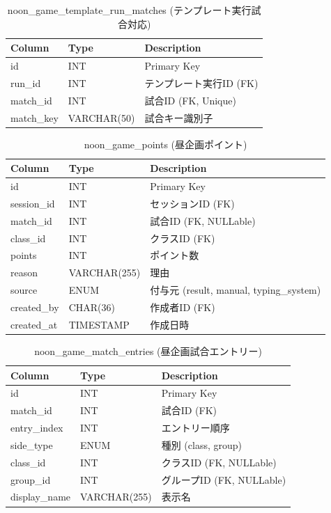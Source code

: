 \documentclass[paper=a4, fontsize=11pt]{jlreq}
\begin{document}
\begin{table}[H]
    \centering
    \caption{noon\_game\_template\_run\_matches (テンプレート実行試合対応)}
    \begin{tabularx}{\textwidth}{|l|l|X|}
        \toprule
        Column & Type & Description \\
        \midrule
        id & INT & Primary Key \\
        run\_id & INT & テンプレート実行ID (FK) \\
        match\_id & INT & 試合ID (FK, Unique) \\
        match\_key & VARCHAR(50) & 試合キー識別子 \\
        \bottomrule
    \end{tabularx}
\end{table}

\begin{table}[H]
    \centering
    \caption{noon\_game\_points (昼企画ポイント)}
    \begin{tabularx}{\textwidth}{|l|l|X|}
        \toprule
        Column & Type & Description \\
        \midrule
        id & INT & Primary Key \\
        session\_id & INT & セッションID (FK) \\
        match\_id & INT & 試合ID (FK, NULLable) \\
        class\_id & INT & クラスID (FK) \\
        points & INT & ポイント数 \\
        reason & VARCHAR(255) & 理由 \\
        source & ENUM & 付与元 (result, manual, typing\_system) \\
        created\_by & CHAR(36) & 作成者ID (FK) \\
        created\_at & TIMESTAMP & 作成日時 \\
        \bottomrule
    \end{tabularx}
\end{table}

\begin{table}[H]
    \centering
    \caption{noon\_game\_match\_entries (昼企画試合エントリー)}
    \begin{tabularx}{\textwidth}{|l|l|X|}
        \toprule
        Column & Type & Description \\
        \midrule
        id & INT & Primary Key \\
        match\_id & INT & 試合ID (FK) \\
        entry\_index & INT & エントリー順序 \\
        side\_type & ENUM & 種別 (class, group) \\
        class\_id & INT & クラスID (FK, NULLable) \\
        group\_id & INT & グループID (FK, NULLable) \\
        display\_name & VARCHAR(255) & 表示名 \\
        \bottomrule
    \end{tabularx}
\end{table}
\end{document}
